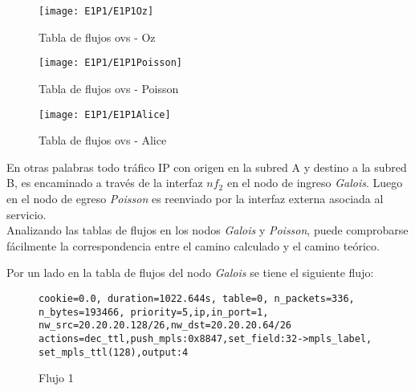 \begin{figure}[h!] 
\centering    
\texttt{[image: E1P1/E1P1Oz]}
\caption[Tabla de flujos ovs - Oz]{Tabla de flujos ovs - Oz}
\label{fig:CU1P1DumpFlows2}
\end{figure}

\begin{figure}[h!] 
\centering    
\texttt{[image: E1P1/E1P1Poisson]}
\caption[Tabla de flujos ovs - Poisson]{Tabla de flujos ovs - Poisson}
\label{fig:CU1P1DumpFlows3}
\end{figure}

\begin{figure}[h!] 
\centering    
\texttt{[image: E1P1/E1P1Alice]}
\caption[Tabla de flujos ovs - Alice]{Tabla de flujos ovs - Alice}
\label{fig:CU1P1DumpFlows4}
\end{figure}


\newpage
En otras palabras todo tr\'afico IP con origen en la subred A y destino a la subred B, es encaminado a través de la interfaz $nf_2$ en el nodo de ingreso \textit{Galois}. Luego en el nodo de egreso \textit{Poisson} es reenviado por la interfaz externa asociada al servicio.\\

Analizando las tablas de flujos en los nodos \textit{Galois} y \textit{Poisson}, puede comprobarse fácilmente la correspondencia entre el camino calculado y el camino te\'orico.

Por un lado en la tabla de flujos del nodo \textit{Galois} se tiene el siguiente flujo:


\begin{figure}[h]
\texttt{cookie=0.0, duration=1022.644s, table=0, n\_packets=336, \\ 
n\_bytes=193466, priority=5,ip,in\_port=1, \\
nw\_src=20.20.20.128/26,nw\_dst=20.20.20.64/26 \\
actions=dec\_ttl,push\_mpls:0x8847,set\_field:32->mpls\_label, \\
set\_mpls\_ttl(128),output:4}
\centering
\caption{Flujo 1}
\label{fig:Flujo1}
\end{figure}

